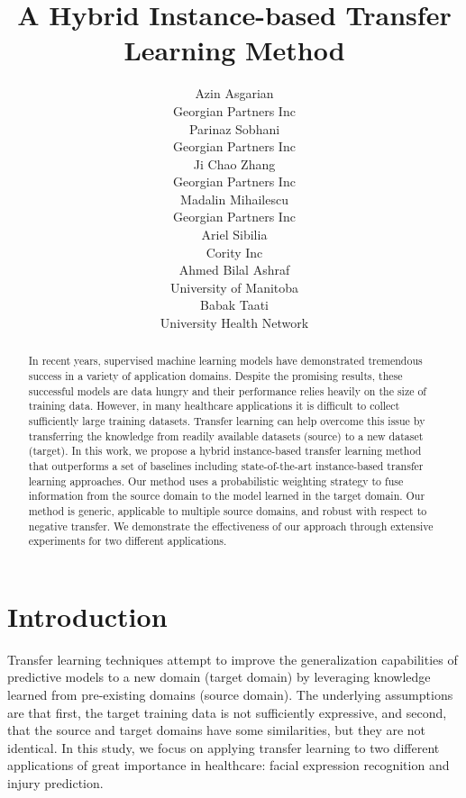 \documentclass{article}
\title{A Hybrid Instance-based Transfer Learning Method}
\author{
  Azin Asgarian\\
  Georgian Partners Inc\\
  \And
    Parinaz Sobhani\\
    Georgian Partners Inc\\
  \And
    Ji Chao Zhang\\
    Georgian Partners Inc\\
  \And
    Madalin Mihailescu\\
    Georgian Partners Inc\\
  \And
    Ariel Sibilia\\
    Cority Inc\\
  \And
    Ahmed Bilal Ashraf\\
    University of Manitoba\\
  \And
    Babak Taati\\
    University Health Network\\
}
\begin{document}
\maketitle
\vspace{-.2cm}
\begin{abstract}
\vspace{-.2cm}
In recent years, supervised machine learning models have demonstrated tremendous success in a variety of application domains. Despite the promising results, these successful models are data hungry and their performance relies heavily on the size of training data. However, in many healthcare applications it is difficult to collect sufficiently large training datasets. Transfer learning can help overcome this issue by transferring the knowledge from readily available datasets (source) to a new dataset (target). In this work, we propose a hybrid instance-based transfer learning method that outperforms a set of baselines including state-of-the-art instance-based transfer learning approaches. Our method uses a probabilistic weighting strategy to fuse information from the source domain to the model learned in the target domain. Our method is generic, applicable to multiple source domains, and robust with respect to negative transfer. We demonstrate the effectiveness of our approach through extensive experiments for two different applications.
\end{abstract}

\vspace{-.3cm}
\section{Introduction}
\vspace{-.3cm}
Transfer learning techniques attempt to improve the generalization capabilities of predictive models to a new domain (target domain) by leveraging knowledge learned from pre-existing domains (source domain). The underlying assumptions are that first, the target training data is not sufficiently expressive, and second, that the source and target domains have some similarities, but they are not identical. In this study, we focus on applying transfer learning to two different applications of great importance in healthcare: facial expression recognition and injury prediction.
\end{document}
